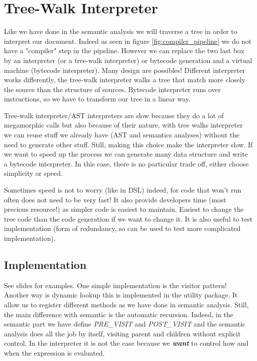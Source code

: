 \chapter{Tree-Walk Interpreter}
\label{chap:tree_walk_inter}
Like we have done in the semantic analysis we will traverse a tree in order to
interpret our document. Indeed as seen in figure \ref{fig:compiler_pipeline} we
do not have a "compiler" step in the pipeline. However we can replace the two
last box by an interpreter (or a tree-walk interpreter) or bytecode generation
and a virtual machine (bytecode interpreter). Many design are possibles!
Different interpreter works differently, the tree-walk interpreter walks a tree
that match more closely the source than the structure of sources. Bytecode
interpreter runs over instructions, so we have to transform our tree in a linear
way.


Tree-walk interpreter/AST interpreters are slow because they do a lot of
megamorphic calls but also because of their nature, with tree walks interpreter
we can reuse stuff we already have (AST and semantics analyses) without the need
to generate other stuff. Still, making this choice make the interpreter slow. If
we want to speed up the process we can generate many data structure and write a
bytecode interpreter. In this case, there is no particular trade off, either
choose simplicity or speed.

Sometimes speed is not to worry (like in DSL) indeed, for code that won't run
often does not need to be very fast! It also provide developers time (most
precious resource!) as simpler code is easiest to maintain. Easiest to change
the tree code than the code generation if we want to change it. It is also
useful to test implementation (form of redundancy, so can be used to test more
complicated implementation).

\section{Implementation}
See slides for examples. One simple implementation is the visitor pattern!
Another way is dynamic lookup this is implemented in the utility package. It
allow us to register different methods as we have done in semantic analysis.
Still, the main difference with semantic is the automatic recursion. Indeed, in
the semantic part we have define \textit{PRE\_VISIT} and \textit{POST\_VISIT}
and the semantic analysis does all the job by itself, visiting parent and
children without explicit control. In the interpreter it is not the case because
we \textit{\textbf{want}} to control how and when the expression is evaluated.

